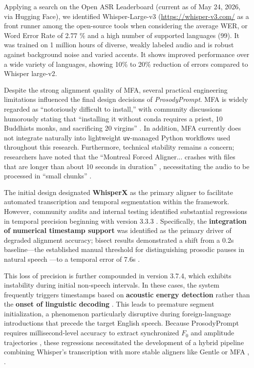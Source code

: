 Applying a search on the Open ASR Leaderboard \cite{srivastav2025} (current as of May 24, 2026, via Hugging Face), we identified Whisper-Large-v3 (\url{https://whisper-v3.com/} as a front runner among the open-source tools when considering the average WER, or Word Error Rate of 2.77 \% and a high number of supported languages (99). It was trained on 1 million hours of diverse, weakly labeled audio and is robust against background noise and varied accents. It shows improved performance over a wide variety of languages, showing 10\% to 20\% reduction of errors compared to Whisper large-v2.

Despite the strong alignment quality of MFA, several practical engineering limitations influenced the final design decisions of \textit{ProsodyPrompt}. MFA is widely regarded as ``notoriously difficult to install,'' with community discussions humorously stating that ``installing it without conda requires a priest, 10 Buddhists monks, and sacrificing 20 virgins'' \cite{bain2025whisperxissues1247}. In addition, MFA currently does not integrate naturally into lightweight \texttt{uv}-managed Python workflows used throughout this research. Furthermore, technical stability remains a concern; researchers have noted that the ``Montreal Forced Aligner... crashes with files that are longer than about 10 seconds in duration'' \cite[p. 7]{fromont2023accuracy}, necessitating the audio to be processed in ``small chunks'' \cite[p. 4]{babinski2019robin}.

The initial design designated \textbf{WhisperX} as the primary aligner to facilitate automated transcription and temporal segmentation within the framework. However, community audits and internal testing identified substantial regressions in temporal precision beginning with version 3.3.3 \cite{bain2025whisperxissues1220}. Specifically, the \textbf{integration of numerical timestamp support} was identified as the primary driver of degraded alignment accuracy; bisect results demonstrated a shift from a 0.2s baseline—the established manual threshold for distinguishing prosodic pauses in natural speech \cite{mistrorigo2018}—to a temporal error of 7.6s \cite{bain2025whisperxissues1220}. 

This loss of precision is further compounded in version 3.7.4, which exhibits instability during initial non-speech intervals. In these cases, the system frequently triggers timestamps based on \textbf{acoustic energy detection} rather than the \textbf{onset of linguistic decoding} \cite{bain2025whisperxissues1220}. This leads to premature segment initialization, a phenomenon particularly disruptive during foreign-language introductions that precede the target English speech. Because ProsodyPrompt requires millisecond-level accuracy to extract synchronized $F_0$ and amplitude trajectories \cite{jadoul2018parselmouth}, these regressions necessitated the development of a hybrid pipeline combining Whisper's transcription with more stable aligners like Gentle or MFA \cite{ochshorn2015gentle}, \cite{mcauliffe2017montreal}.


